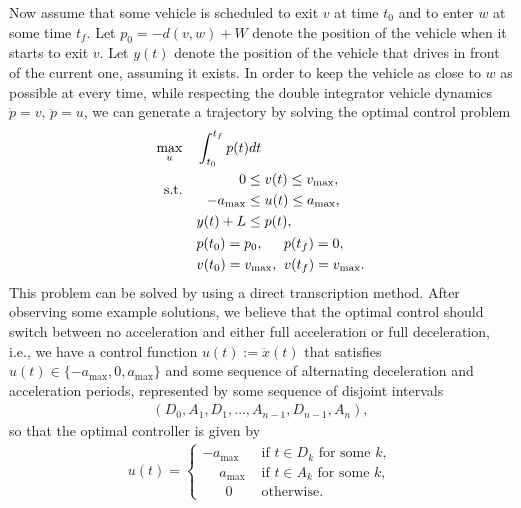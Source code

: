 \documentclass[a4paper]{article}
\theoremstyle{definition}
\theoremstyle{plain}
\begin{document}
Now assume that some vehicle is scheduled to exit $v$ at time $t_{0}$ and to
enter $w$ at some time $t_{f}$. Let $p_{0} = -d(v,w) + W$ denote the position of
the vehicle when it starts to exit $v$. Let $y(t)$ denote the position of the
vehicle that drives in front of the current one, assuming it exists. In order to
keep the vehicle as close to $w$ as possible at every time, while respecting
the double integrator vehicle dynamics $\dot{p} = v, \, \ddot{p} = u$, we can
generate a trajectory by solving the optimal control problem
\begin{equation}
  \label{eq:optimal_control}
  \begin{aligned}
  \max_{u}    \quad & \int_{t_{0}}^{t_{f}} p(t) dt \\
  \begin{alignedat}{2}\text{s.t.}\\ {}\end{alignedat} \quad &\begin{alignedat}{2}
                     0 \leq \; &v(t) \leq v_{\max} , \\
                     {-a_{\max}} \leq \; &u(t) \leq a_{\max} , \\
                    y(t) + L \leq \; & p(t) , \\
                    \end{alignedat} \\
                    &\begin{alignedat}[t]{2}
                    & p(t_{0}) = p_{0} , &&  p(t_{f}) = 0 , \\
                    & v(t_{0}) = v_{\max} , \;\; && v(t_{f}) = v_{\max} .
                    \end{alignedat}
  \end{aligned}
\end{equation}
%
This problem can be solved by using a direct transcription method. After
observing some example solutions, we believe that the optimal control should
switch between no acceleration and either full acceleration or full
deceleration, i.e., we have a control function $u(t) := \ddot{x}(t)$ that
satisfies $u(t) \in \{-a_{\max}, 0, a_{\max}\}$ and some sequence of alternating
deceleration and acceleration periods, represented by some sequence of disjoint
intervals
\begin{align*}
  (D_{0}, A_{1}, D_{1}, \dots, A_{n-1}, D_{n-1}, A_{n}) ,
\end{align*}
so that the optimal controller is given by
\begin{align*}
  u(t) = \begin{cases}
           {-a_{\max}} &\text{ if } t \in D_{k} \text{ for some } k , \\
           \phantom{-} a_{\max}   &\text{ if } t \in A_{k} \text{ for some } k , \\
           \phantom{-} \;\, 0 &\text{ otherwise. }
         \end{cases}
\end{align*}
\end{document}
